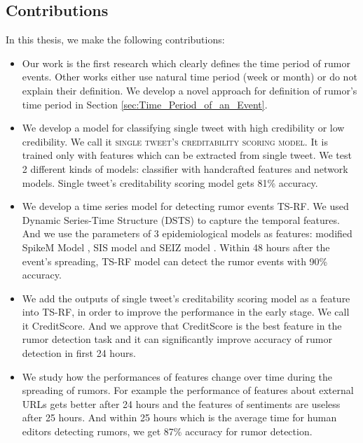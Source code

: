  \newpage
 \subsection{Contributions}
In this thesis, we make the following contributions:

\begin{itemize}
	\item Our work is the first research which clearly defines the time period of rumor events. Other works either use natural time period (week or month) or do not explain their definition. We develop a novel approach for definition of rumor's time period in Section \ref{sec:Time_Period_of_an_Event}. 
	\item We develop a model for classifying single tweet with high credibility or low credibility. We call it \textsc{single tweet's creditability scoring model}. It is trained only with features which can be extracted from single tweet. We test 2 different kinds of models: classifier with handcrafted features and network models.   Single tweet's creditability scoring model gets 81\% accuracy.

 	\item We develop a time series model for detecting rumor events TS-RF. We used Dynamic Series-Time Structure (DSTS)\cite{liu2015real} to capture the temporal  features. And we use the parameters of 3 epidemiological models as features: modified SpikeM Model \cite{kwon2013prominent}, SIS model and SEIZ model \cite{jin2013epidemiological}. Within 48 hours after the event's spreading, TS-RF model can detect the rumor events with 90\% accuracy. 
 	\item  We add the outputs of single tweet's creditability scoring model as a feature into TS-RF, in order to improve the performance in the early stage. We call it CreditScore. And we approve that CreditScore is the best feature in the rumor detection task and it can significantly improve accuracy of rumor detection in first 24 hours.

 	\item We study how the performances of features change over time during the spreading of rumors. For example the performance of features about external URLs gets better after 24 hours and the features of sentiments are useless after 25 hours. And within 25 hours which is the average time for human editors detecting rumors, we get 87\% accuracy for rumor detection.

 \end{itemize}
 
